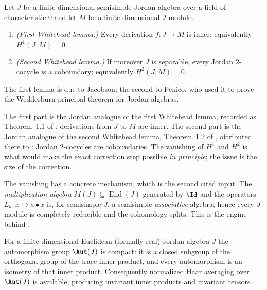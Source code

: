 \begin{theorem}\label{thm:whitehead}
Let $J$ be a finite-dimensional semisimple Jordan algebra over a field of
characteristic $0$ and let $M$ be a finite-dimensional $J$-module.
\begin{enumerate}
\item \emph{(First Whitehead lemma.)} Every derivation $f\colon J\to M$ is
inner; equivalently $H^{1}(J,M)=0$.
\item \emph{(Second Whitehead lemma.)} If moreover $J$ is separable, every
Jordan $2$-cocycle is a coboundary; equivalently $H^{2}(J,M)=0$.
\end{enumerate}
The first lemma is due to Jacobson; the second to Penico, who used it to prove
the Wedderburn principal theorem for Jordan algebras.
\end{theorem}

\noindent The first part is the Jordan analogue of the first Whitehead lemma,
recorded as Theorem~1.1 of \cite{ChuRusso2016}: derivations from $J$ to $M$ are
inner. The second part is the Jordan analogue of the second Whitehead lemma,
Theorem~1.2 of \cite{ChuRusso2016}, attributed there to \cite{Penico1951}: Jordan
$2$-cocycles are coboundaries. The vanishing of $H^{1}$ and $H^{2}$ is what
would make the exact correction step possible \emph{in principle}; the issue is
the size of the correction.

The vanishing has a concrete mechanism, which is the second cited input. The
\emph{multiplication algebra} $M(J)\subseteq\operatorname{End}(J)$ generated by
$\Id$ and the operators $L_{a}\colon x\mapsto a\bullet x$ is, for semisimple
$J$, a semisimple \emph{associative} algebra; hence every $J$-module is
completely reducible and the cohomology splits. This is the engine behind
.

\begin{proposition}\label{prop:aut-compact}
For a finite-dimensional Euclidean (formally real) Jordan algebra $J$ the
automorphism group $\Aut(J)$ is compact: it is a closed subgroup of the
orthogonal group of the trace inner product, and every automorphism is an
isometry of that inner product. Consequently normalized Haar averaging over
$\Aut(J)$ is available, producing invariant inner products and invariant
tensors.
\end{proposition}

